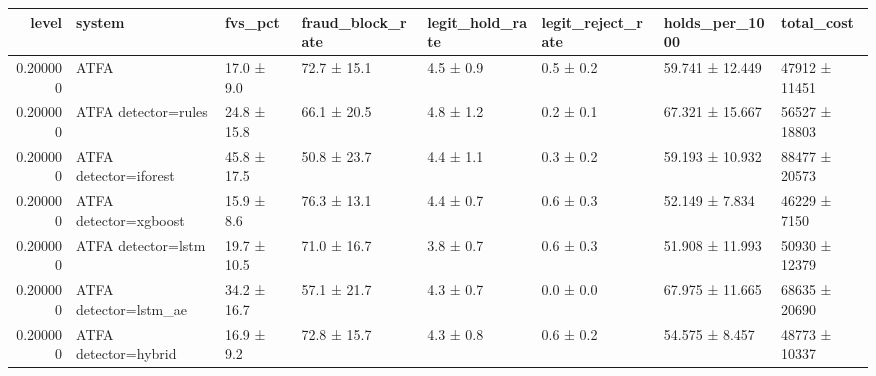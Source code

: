 \begin{tabular}{rlllllll}
\toprule
level & system & fvs\_pct & fraud\_block\_rate & legit\_hold\_rate & legit\_reject\_rate & holds\_per\_1000 & total\_cost \\
\midrule
0.200000 & ATFA & 17.0 ± 9.0 & 72.7 ± 15.1 & 4.5 ± 0.9 & 0.5 ± 0.2 & 59.741 ± 12.449 & 47912 ± 11451 \\
0.200000 & ATFA detector=rules & 24.8 ± 15.8 & 66.1 ± 20.5 & 4.8 ± 1.2 & 0.2 ± 0.1 & 67.321 ± 15.667 & 56527 ± 18803 \\
0.200000 & ATFA detector=iforest & 45.8 ± 17.5 & 50.8 ± 23.7 & 4.4 ± 1.1 & 0.3 ± 0.2 & 59.193 ± 10.932 & 88477 ± 20573 \\
0.200000 & ATFA detector=xgboost & 15.9 ± 8.6 & 76.3 ± 13.1 & 4.4 ± 0.7 & 0.6 ± 0.3 & 52.149 ± 7.834 & 46229 ± 7150 \\
0.200000 & ATFA detector=lstm & 19.7 ± 10.5 & 71.0 ± 16.7 & 3.8 ± 0.7 & 0.6 ± 0.3 & 51.908 ± 11.993 & 50930 ± 12379 \\
0.200000 & ATFA detector=lstm\_ae & 34.2 ± 16.7 & 57.1 ± 21.7 & 4.3 ± 0.7 & 0.0 ± 0.0 & 67.975 ± 11.665 & 68635 ± 20690 \\
0.200000 & ATFA detector=hybrid & 16.9 ± 9.2 & 72.8 ± 15.7 & 4.3 ± 0.8 & 0.6 ± 0.2 & 54.575 ± 8.457 & 48773 ± 10337 \\
\bottomrule
\end{tabular}
